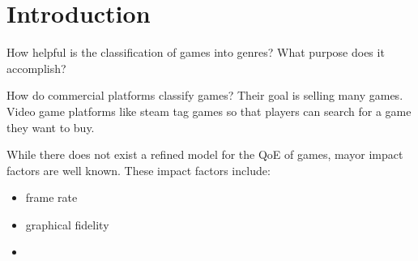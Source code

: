 
\section{Introduction}

How helpful is the classification of games into genres? What purpose does it accomplish?

How do commercial platforms classify games? Their goal is selling many games. Video game platforms like steam tag games so that players can search for a game they want to buy. 

While there does not exist a refined model for the QoE of games, mayor impact factors are well known. These impact factors include:
\begin{itemize}
\item frame rate
\item graphical fidelity
\item 
\end{itemize}